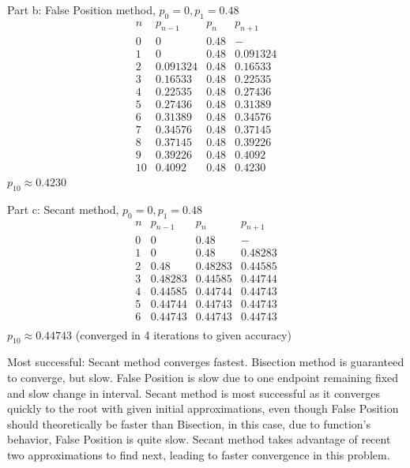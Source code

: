 \begin{enumerate}
    Part b: False Position method, \( p_0 = 0, p_1 = 0.48 \)
    \[
      \begin{array}{l|lll}
        n & p_{n-1} & p_n & p_{n+1} \\
        \hline
        0 & 0 & 0.48 & - \\
        1 & 0 & 0.48 & 0.091324 \\
        2 & 0.091324 & 0.48 & 0.16533 \\
        3 & 0.16533 & 0.48 & 0.22535 \\
        4 & 0.22535 & 0.48 & 0.27436 \\
        5 & 0.27436 & 0.48 & 0.31389 \\
        6 & 0.31389 & 0.48 & 0.34576 \\
        7 & 0.34576 & 0.48 & 0.37145 \\
        8 & 0.37145 & 0.48 & 0.39226 \\
        9 & 0.39226 & 0.48 & 0.4092 \\
        10 & 0.4092 & 0.48 & 0.4230 \\
      \end{array}
    \]
    \( p_{10} \approx 0.4230 \)

    Part c: Secant method, \( p_0 = 0, p_1 = 0.48 \)
    \[
      \begin{array}{l|lll}
        n & p_{n-1} & p_n & p_{n+1} \\
        \hline
        0 & 0 & 0.48 & - \\
        1 & 0 & 0.48 & 0.48283 \\
        2 & 0.48 & 0.48283 & 0.44585 \\
        3 & 0.48283 & 0.44585 & 0.44744 \\
        4 & 0.44585 & 0.44744 & 0.44743 \\
        5 & 0.44744 & 0.44743 & 0.44743 \\
        6 & 0.44743 & 0.44743 & 0.44743 \\
      \end{array}
    \]
    \( p_{10} \approx 0.44743 \) (converged in 4 iterations to given accuracy)

    Most successful: Secant method converges fastest.
    Bisection method is guaranteed to converge, but slow.
    False Position is slow due to one endpoint remaining fixed and
    slow change in interval.
    Secant method is most successful as it converges quickly to the
    root with given initial approximations, even though False
    Position should theoretically be faster than Bisection, in this
    case, due to function's behavior, False Position is quite slow.
    Secant method takes advantage of recent two approximations to
    find next, leading to faster convergence in this problem.


\end{enumerate}
